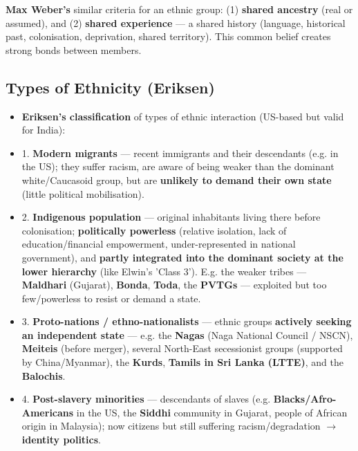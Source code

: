 \begin{KeyConcept}
\textbf{Max Weber's} similar criteria for an ethnic group: (1) \textbf{shared ancestry} (real or assumed), and (2) \textbf{shared experience} --- a shared history (language, historical past, colonisation, deprivation, shared territory). This common belief creates strong bonds between members.
\end{KeyConcept}

\subsection{Types of Ethnicity (Eriksen)}

\begin{KeyConcept}
\begin{itemize}
\item \textbf{Eriksen's classification} of types of ethnic interaction (US-based but valid for India):
\item 1. \textbf{Modern migrants} --- recent immigrants and their descendants (e.g. in the US); they suffer racism, are aware of being weaker than the dominant white/Caucasoid group, but are \textbf{unlikely to demand their own state} (little political mobilisation).
\item 2. \textbf{Indigenous population} --- original inhabitants living there before colonisation; \textbf{politically powerless} (relative isolation, lack of education/financial empowerment, under-represented in national government), and \textbf{partly integrated into the dominant society at the lower hierarchy} (like Elwin's 'Class 3'). E.g. the weaker tribes --- \textbf{Maldhari} (Gujarat), \textbf{Bonda}, \textbf{Toda}, the \textbf{PVTGs} --- exploited but too few/powerless to resist or demand a state.
\item 3. \textbf{Proto-nations / ethno-nationalists} --- ethnic groups \textbf{actively seeking an independent state} --- e.g. the \textbf{Nagas} (Naga National Council / NSCN), \textbf{Meiteis} (before merger), several North-East secessionist groups (supported by China/Myanmar), the \textbf{Kurds}, \textbf{Tamils in Sri Lanka (LTTE)}, and the \textbf{Balochis}.
\item 4. \textbf{Post-slavery minorities} --- descendants of slaves (e.g. \textbf{Blacks/Afro-Americans} in the US, the \textbf{Siddhi} community in Gujarat, people of African origin in Malaysia); now citizens but still suffering racism/degradation $\rightarrow$ \textbf{identity politics}.
\end{itemize}
\end{KeyConcept}

